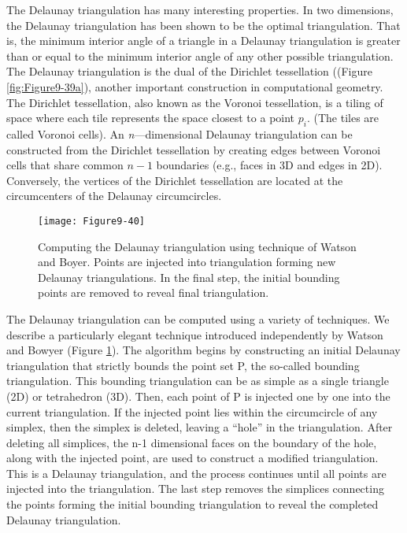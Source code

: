 The Delaunay triangulation has many interesting properties. In two dimensions, the Delaunay triangulation has been shown to be the optimal triangulation. That is, the minimum interior angle of a triangle in a Delaunay triangulation is greater than or equal to the minimum interior angle of any other possible triangulation. The Delaunay triangulation is the dual of the Dirichlet tessellation ((Figure  \ref{fig:Figure9-39a}), another important construction in computational geometry. The Dirichlet tessellation, also known as the Voronoi tessellation, is a tiling of space where each tile represents the space closest to a point $p_i$. (The tiles are called Voronoi cells). An \emph{n}---dimensional Delaunay triangulation can be constructed from the Dirichlet tessellation by creating edges between Voronoi cells that share common $n-1$ boundaries (e.g., faces in 3D and edges in 2D). Conversely, the vertices of the Dirichlet tessellation are located at the circumcenters of the Delaunay circumcircles.

\begin{figure}[!htb]
	\centering
	\texttt{[image: Figure9-40]}
	\caption{Computing the Delaunay triangulation using technique of Watson and Boyer. Points are injected into triangulation forming new Delaunay triangulations. In the final step, the initial bounding points are removed to reveal final triangulation.}
	\label{fig:Figure9-40}
\end{figure}

The Delaunay triangulation can be computed using a variety of techniques. We describe a particularly elegant technique introduced independently by Watson \cite{Watson81} and Bowyer \cite{Bowyer81} (Figure \ref{fig:Figure9-40}). The algorithm begins by constructing an initial Delaunay triangulation that strictly bounds the point set P, the so-called bounding triangulation. This bounding triangulation can be as simple as a single triangle (2D) or tetrahedron (3D). Then, each point of P is injected one by one into the current triangulation. If the injected point lies within the circumcircle of any simplex, then the simplex is deleted, leaving a ``hole'' in the triangulation. After deleting all simplices, the n-1 dimensional faces on the boundary of the hole, along with the injected point, are used to construct a modified triangulation. This is a Delaunay triangulation, and the process continues until all points are injected into the triangulation. The last step removes the simplices connecting the points forming the initial bounding triangulation to reveal the completed Delaunay triangulation.

